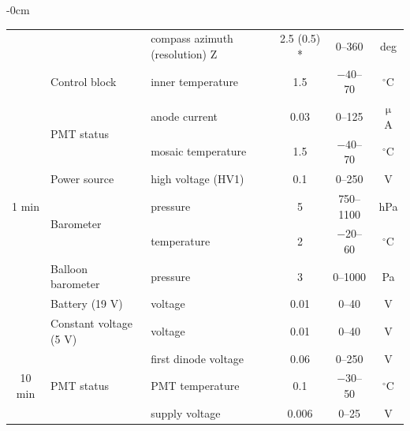 \documentclass[universe,article,accept,moreauthors,pdftex]{Definitions/mdpi}
\begin{document}
\begin{table}[H]
\begin{adjustwidth}{-\extralength}{0cm}
\begin{tabular}{cllcc@{\hspace{1mm}}c@{\hspace{1mm}}}
                                                      \cmidrule{3-6}
                       &                              & compass azimuth (resolution) Z &2.5 (0.5) * &0--360&deg\\
                       \cmidrule{2-6}
                       &Control block                 & inner temperature& 1.5 & $-40$--70 &$^\circ$C\\
\midrule
\multirow{7}{*}{1 min \vspace{-36pt}} & \multirow{2}{*}{PMT status \vspace{-6pt}} & anode current & 0.03 & 0--125 & $\upmu$A\\
                                                      \cmidrule{3-6}
                       &                              & mosaic temperature & 1.5 & $-40$--70 & $^\circ$C\\
                       \cmidrule{2-6}
                       & Power source                 & high voltage (HV1) & 0.1 & 0--250 & V\\
                       \cmidrule{2-6}
                       & \multirow{2}{*}{Barometer \vspace{-6pt}}   & pressure & 5 & 750--1100 & hPa\\
                                                      \cmidrule{3-6}
                       &                              & temperature& 2 & $-$20--60 &$^\circ$C\\
                       \cmidrule{2-6}
                       & Balloon barometer            & pressure   & 3 & 0--1000 & Pa\\
                       \cmidrule{2-6}
                       & Battery (19 V)                & voltage & 0.01 & 0--40 & V\\
                       \cmidrule{2-6}
                       & Constant voltage (5 V)        & voltage & 0.01 & 0--40 & V\\
\midrule
\multirow{5}{*}{10 min \vspace{-16pt}} & \multirow{3}{*}{PMT status \vspace{-12pt}} & first dinode voltage & 0.06 & 0--250 & V\\
                                                      \cmidrule{3-6}
                       &                              & PMT temperature & 0.1 & $-$30--50 & $^\circ$C\\
                                                      \cmidrule{3-6}
                       &                              & supply voltage & 0.006 & 0--25 & V\\

\end{tabular}
\end{adjustwidth}
\end{table}
\end{document}
